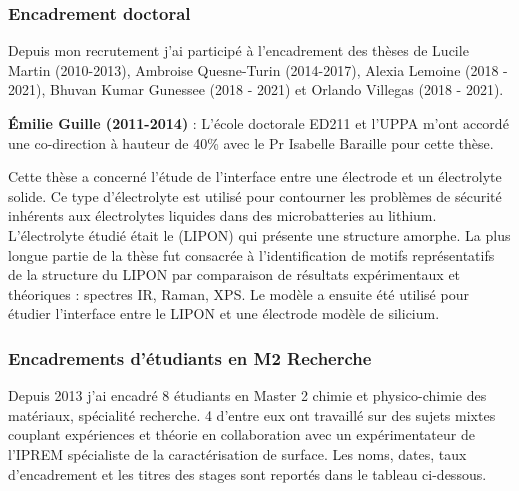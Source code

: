 \documentclass[11pt]{artuppax}
\newcounter{subsec}[section]
\begin{document}
\subsubsection{Encadrement doctoral}

Depuis mon recrutement j'ai participé à l'encadrement des thèses de
Lucile Martin (2010-2013), Ambroise Quesne-Turin (2014-2017),
Alexia Lemoine (2018 - 2021), Bhuvan Kumar Gunessee (2018 - 2021)
et Orlando Villegas (2018 - 2021).

\textbf{Émilie Guille (2011-2014)} :
L'école doctorale ED211 et l'UPPA m'ont accordé une co-direction
à hauteur de 40\% avec le Pr Isabelle Baraille pour cette thèse.

Cette thèse a concerné l'étude de l'interface entre une électrode et un électrolyte
solide. Ce type d'électrolyte est utilisé pour contourner les problèmes de sécurité
inhérents aux électrolytes liquides dans des microbatteries au lithium. L'électrolyte
étudié était le  (LIPON) qui présente une structure amorphe. La plus
longue partie de la thèse fut consacrée à l'identification de motifs représentatifs de
la structure du LIPON par comparaison de résultats expérimentaux et théoriques :
spectres IR, Raman, XPS. Le modèle a ensuite été utilisé pour étudier l'interface
entre le LIPON et une électrode modèle de silicium.

\subsubsection{Encadrements d'étudiants en M2 Recherche}

Depuis 2013 j'ai encadré 8 étudiants en Master 2 chimie et physico-chimie des matériaux,
spécialité recherche. 4 d'entre eux ont travaillé sur des sujets mixtes couplant expériences
et théorie en collaboration avec un expérimentateur de l'IPREM spécialiste de la caractérisation de
surface. Les noms, dates, taux d'encadrement et les titres des stages sont reportés
dans le tableau ci-dessous.
\end{document}
